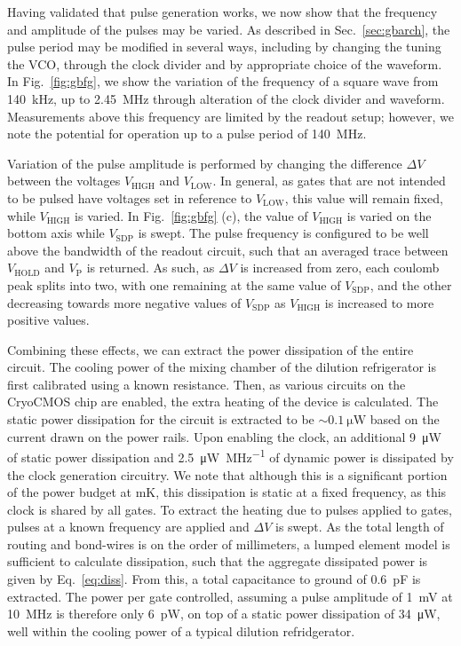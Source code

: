 Having validated that pulse generation works, we now show that the frequency and amplitude of the pulses may be varied. As described in Sec.~\ref{sec:gbarch}, the pulse period may be modified in several ways, including by changing the tuning the VCO, through the clock divider and by appropriate choice of the waveform. In Fig.~\ref{fig:gbfg}, we show the variation of the frequency of a square wave from \SI{140}{\kilo\hertz}, up to \SI{2.45}{\mega\hertz} through alteration of the clock divider and waveform. Measurements above this frequency are limited by the readout setup; however, we note the potential for operation up to a pulse period of \SI{140}{\mega\hertz}.

Variation of the pulse amplitude is performed by changing the difference $\Delta V$ between the voltages $V_\textrm{HIGH}$ and $V_\textrm{LOW}$. In general, as gates that are not intended to be pulsed have voltages set in reference to $V_\textrm{LOW}$, this value will remain fixed, while $V_\textrm{HIGH}$ is varied. In Fig.~\ref{fig:gbfg} (c), the value of $V_\textrm{HIGH}$ is varied on the bottom axis while $V_\textrm{SDP}$ is swept. The pulse frequency is configured to be well above the bandwidth of the readout circuit, such that an averaged trace between $V_\textrm{HOLD}$ and $V_\textrm{P}$ is returned. As such, as $\Delta V$ is increased from zero, each coulomb peak splits into two, with one remaining at the same value of $V_\textrm{SDP}$, and the other decreasing towards more negative values of $V_\textrm{SDP}$ as $V_\textrm{HIGH}$ is increased to more positive values.

Combining these effects, we can extract the power dissipation of the entire circuit. The cooling power of the mixing chamber of the dilution refrigerator is first calibrated using a known resistance. Then, as various circuits on the CryoCMOS chip are enabled, the extra heating of the device is calculated. The static power dissipation for the circuit is extracted to be $\sim \SI{0.1}{\micro\watt}$ based on the current drawn on the power rails. Upon enabling the clock, an additional \SI{9}{\micro\watt} of static power dissipation and \SI[per-mode=symbol]{2.5}{\micro\watt\per\mega\hertz} of dynamic power is dissipated by the clock generation circuitry. We note that although this is a significant portion of the power budget at mK, this dissipation is static at a fixed frequency, as this clock is shared by all gates. To extract the heating due to pulses applied to gates, pulses at a known frequency are applied and $\Delta V$ is swept. As the total length of routing and bond-wires is on the order of millimeters, a lumped element model is sufficient to calculate dissipation, such that the aggregate dissipated power is given by Eq.~\ref{eq:diss}. From this, a total capacitance to ground of \SI{0.6}{\pico\farad} is extracted. The power per gate controlled, assuming a pulse amplitude of \SI{1}{\milli\volt} at \SI{10}{\mega\hertz} is therefore only \SI{6}{\pico\watt}, on top of a static power dissipation of \SI{34}{\micro\watt}, well within the cooling power of a typical dilution refridgerator.

